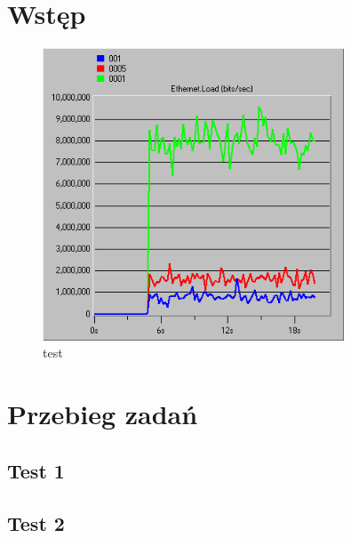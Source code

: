 \documentclass{article}
\begin{document}

\begin{tableofcontents}
  \listoffigures
\end{tableofcontents}
\newpage
\section{Wstęp}

\begin{figure}[ht]
  \centering
  \includegraphics[width=0.8\textwidth]{screens/samo/load.png}
  \caption{test}
\end{figure}
\section{Przebieg zadań}
\subsection{Test 1}
\subsection{Test 2}
\end{document}
